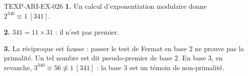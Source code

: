 \begin{corrige}{TEXP-ARI-EX-026}
\textbf{1.} Un calcul d'exponentiation modulaire donne $2^{340}\equiv1\ [341]$.

\textbf{2.} $341=11\times31$ : il n'est pas premier.

\textbf{3.} La réciproque est fausse : passer le test de Fermat en base $2$ ne
prouve pas la primalité. Un tel nombre est dit pseudo-premier de base $2$. En
base $3$, en revanche, $3^{340}\equiv56\not\equiv1\ [341]$ : la base $3$ est un
témoin de non-primalité.
\end{corrige}
